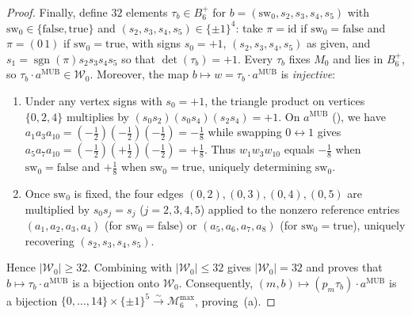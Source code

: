 \documentclass[11pt,a4paper]{article}
\theoremstyle{plain}
\theoremstyle{definition}
\theoremstyle{remark}
\newcommand{\sgn}{\operatorname{sgn}}
\newcommand{\Mman}{\mathcal{M}_6}
\newcommand{\Bplus}{B_6^+}
\begin{document}
\begin{proof}
Finally, define $32$ elements $\tau_b \in \Bplus$ for $b = (\mathrm{sw}_0, s_2, s_3, s_4, s_5)$ with $\mathrm{sw}_0 \in \{\mathrm{false}, \mathrm{true}\}$ and $(s_2, s_3, s_4, s_5) \in \{\pm 1\}^4$: take $\pi = \mathrm{id}$ if $\mathrm{sw}_0 = \mathrm{false}$ and $\pi = (0\,1)$ if $\mathrm{sw}_0 = \mathrm{true}$, with signs $s_0 = +1$, $(s_2, s_3, s_4, s_5)$ as given, and $s_1 = \sgn(\pi) s_2 s_3 s_4 s_5$ so that $\det(\tau_b) = +1$. Every $\tau_b$ fixes $M_0$ and lies in $\Bplus$, so $\tau_b \cdot a^{\mathrm{MUB}} \in \mathcal{W}_0$. Moreover, the map $b \mapsto w = \tau_b \cdot a^{\mathrm{MUB}}$ is \emph{injective}:
\begin{enumerate}[label=\arabic*., leftmargin=1.8em, itemsep=2pt]
  \item Under any vertex signs with $s_0 = +1$, the triangle product on vertices $\{0,2,4\}$ multiplies by $(s_0 s_2)(s_0 s_4)(s_2 s_4) = +1$. On $a^{\mathrm{MUB}}$ (), we have $a_1 a_3 a_{10} = (-\tfrac{1}{2})(-\tfrac{1}{2})(-\tfrac{1}{2}) = -\tfrac{1}{8}$ while swapping $0 \leftrightarrow 1$ gives $a_5 a_7 a_{10} = (-\tfrac{1}{2})(+\tfrac{1}{2})(-\tfrac{1}{2}) = +\tfrac{1}{8}$. Thus $w_1 w_3 w_{10}$ equals $-\tfrac{1}{8}$ when $\mathrm{sw}_0 = \mathrm{false}$ and $+\tfrac{1}{8}$ when $\mathrm{sw}_0 = \mathrm{true}$, uniquely determining $\mathrm{sw}_0$.
  \item Once $\mathrm{sw}_0$ is fixed, the four edges $(0,2), (0,3), (0,4), (0,5)$ are multiplied by $s_0 s_j = s_j$ ($j = 2,3,4,5$) applied to the nonzero reference entries $(a_1, a_2, a_3, a_4)$ (for $\mathrm{sw}_0 = \mathrm{false}$) or $(a_5, a_6, a_7, a_8)$ (for $\mathrm{sw}_0 = \mathrm{true}$), uniquely recovering $(s_2, s_3, s_4, s_5)$.
\end{enumerate}
Hence $\lvert\mathcal{W}_0\rvert \ge 32$. Combining with $\lvert\mathcal{W}_0\rvert \le 32$ gives $\lvert\mathcal{W}_0\rvert = 32$ and proves that $b \mapsto \tau_b \cdot a^{\mathrm{MUB}}$ is a bijection onto $\mathcal{W}_0$. Consequently, $(m, b) \mapsto (p_m \tau_b) \cdot a^{\mathrm{MUB}}$ is a bijection $\{0,\dots,14\} \times \{\pm 1\}^5 \xrightarrow{\sim} \Mman^{\max}$, proving~(a).


\end{proof}
\end{document}
